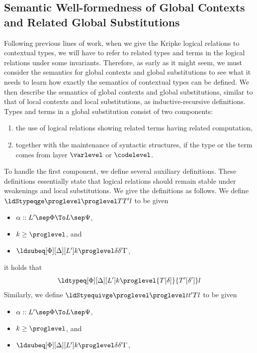 \subsection{Semantic Well-formedness of Global Contexts and Related Global Substitutions}

Following previous lines of work, when we give the Kripke logical relations to
contextual types, we will have to refer to related types and terms in the logical
relations under some invariants. %
Therefore, as early as it might seem, we must consider the semantics for global
contexts and global substitutions to see what it needs to learn how exactly the
semantics of contextual types can be defined. %
We then describe the semantics of global contexts and global substitutions, similar to
that of local contexts and local substitutions, as inductive-recursive definitions. %
Types and terms in a global substitution consist of two components:
\begin{enumerate}
\item the use of logical relations showing related terms having related computation,
\item together with the maintenance of syntactic structures, if the type or the term
  comes from layer $\varlevel$ or $\codelevel$.
\end{enumerate}
To handle the first component, we define several auxiliary definitions. %
These definitions essentially state that logical relations should remain stable under
weakenings and local substitutions. %
We give the definitions as follows. %
We define $\ldStypeqge \proglevel \proglevel T{T'} l$ to be given
\begin{itemize}
\item $\alpha :: L' \sep \Phi \To L \sep \Psi$,
\item $k \ge \proglevel$, and
\item $\ldsubeq[\Phi][\Delta][L'] k \proglevel \delta{\delta'}{\Gamma}$,
\end{itemize}
it holds that
\[
  \ldtypeq[\Phi][\Delta][L'] k \proglevel{T[\delta]}{T'[\delta']} l
\]
Similarly, we define $\ldStyequivge \proglevel \proglevel t{t'} T l$ to be given
\begin{itemize}
\item $\alpha :: L' \sep \Phi \To L \sep \Psi$, 
\item $k \ge \proglevel$, and
\item $\ldsubeq[\Phi][\Delta][L'] k \proglevel \delta{\delta'}{\Gamma}$,
\end{itemize}

